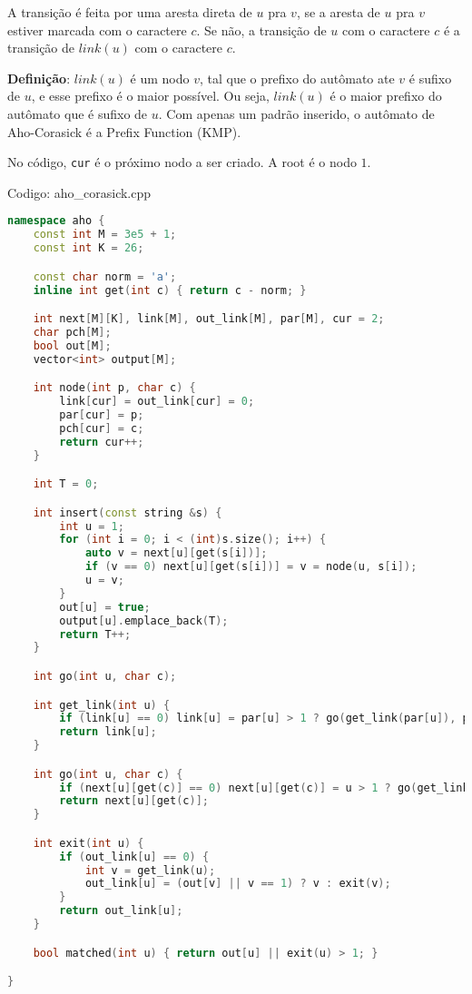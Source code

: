 \documentclass[10pt, a4paper, oneside]{book}
\begin{document}
A transição é feita por uma aresta direta de $u$ pra $v$, se a aresta de $u$ pra $v$ estiver marcada com o caractere $c$. Se não, a transição de $u$ com o caractere $c$ é a transição de $link(u)$ com o caractere $c$.



\textbf{Definição}: $link(u)$ é um nodo $v$, tal que o prefixo do autômato ate $v$ é sufixo de $u$, e esse prefixo é o maior possível. Ou seja, $link(u)$ é o maior prefixo do autômato que é sufixo de $u$. Com apenas um padrão inserido, o autômato de Aho-Corasick é a Prefix Function (KMP).



No código, \texttt{cur} é o próximo nodo a ser criado. A root é o nodo $1$.
\hfill

Codigo: aho\_corasick.cpp

\begin{lstlisting}[language=C++]
namespace aho {
    const int M = 3e5 + 1;
    const int K = 26;

    const char norm = 'a';
    inline int get(int c) { return c - norm; }

    int next[M][K], link[M], out_link[M], par[M], cur = 2;
    char pch[M];
    bool out[M];
    vector<int> output[M];

    int node(int p, char c) {
        link[cur] = out_link[cur] = 0;
        par[cur] = p;
        pch[cur] = c;
        return cur++;
    }

    int T = 0;

    int insert(const string &s) {
        int u = 1;
        for (int i = 0; i < (int)s.size(); i++) {
            auto v = next[u][get(s[i])];
            if (v == 0) next[u][get(s[i])] = v = node(u, s[i]);
            u = v;
        }
        out[u] = true;
        output[u].emplace_back(T);
        return T++;
    }

    int go(int u, char c);

    int get_link(int u) {
        if (link[u] == 0) link[u] = par[u] > 1 ? go(get_link(par[u]), pch[u]) : 1;
        return link[u];
    }

    int go(int u, char c) {
        if (next[u][get(c)] == 0) next[u][get(c)] = u > 1 ? go(get_link(u), c) : 1;
        return next[u][get(c)];
    }

    int exit(int u) {
        if (out_link[u] == 0) {
            int v = get_link(u);
            out_link[u] = (out[v] || v == 1) ? v : exit(v);
        }
        return out_link[u];
    }

    bool matched(int u) { return out[u] || exit(u) > 1; }

}\end{lstlisting}
\hfill
\end{document}
